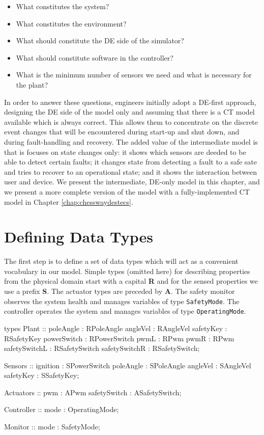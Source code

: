 \begin{itemize}
\item What constitutes the system?
\item What constitutes the environment?
\item What should constitute the DE side of the simulator?
\item What should constitute software in the controller?
\item What is the minimum number of sensors we need and what is
  necessary for the plant?
\end{itemize}

In order to answer these questions, engineers initially adopt a
DE-first approach, designing the DE side of the model only and
assuming that there is a CT model available which is always correct.
This allows them to concentrate on the discrete event changes that
will be encountered during start-up and shut down, and during
fault-handling and recovery.  The added value of the intermediate
model is that is focuses on state changes only: it shows which sensors
are deeded to be able to detect certain faults; it changes state from
detecting a fault to a safe sate and tries to recover to an
operational state; and it shows the interaction between user and
device.  We present the intermediate, DE-only model in this chapter,
and we present a more complete version of the model with a
fully-implemented CT model in Chapter \ref{chap:chesswaydestecs}.
\section{Defining Data Types}
The first step is to define a set of data types which will act as a
convenient vocabulary in our model.  Simple types (omitted here) for
describing properties from the physical domain start with a capital
\textbf{R} and for the sensed properties we use a prefix
\textbf{S}. The actuator types are preceded by \textbf{A}.  The safety
monitor observes the system health and manages variables of type
\texttt{SafetyMode}.  The controller operates the system and manages
variables of type \texttt{OperatingMode}.

\begin{vdm_al}
	types
		Plant ::
			poleAngle : RPoleAngle
			angleVel : RAngleVel
			safetyKey : RSafetyKey
			powerSwitch : RPowerSwitch
			pwmL : RPwm
			pwmR : RPwm
			safetySwitchL : RSafetySwitch
			safetySwitchR : RSafetySwitch;

		Sensors ::
			ignition : SPowerSwitch
			poleAngle : SPoleAngle
			angleVel : SAngleVel
			safetyKey : SSafetyKey;

		Actuators ::
			pwm : APwm
			safetySwitch : ASafetySwitch;

		Controller ::
			mode : OperatingMode;

		Monitor ::
			mode : SafetyMode;
\end{vdm_al}

